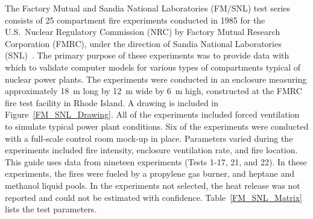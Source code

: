 The Factory Mutual and Sandia National Laboratories (FM/SNL) test series consists of 25 compartment fire experiments conducted in 1985 for the U.S.~Nuclear Regulatory Commission (NRC) by Factory Mutual Research Corporation (FMRC), under the direction of Sandia National Laboratories (SNL)~\cite{Nowlen:NUREG4681,Nowlen:NUREG4527}. The primary purpose of these experiments was to provide data with which to validate computer models for various types of compartments typical of nuclear power plants. The experiments were conducted in an enclosure measuring approximately 18~m long by 12~m wide by 6~m high, constructed at the FMRC fire test facility in Rhode Island. A drawing is included in Figure~\ref{FM_SNL_Drawing}. All of the experiments included forced ventilation to simulate typical power plant conditions. Six of the experiments were conducted with a full-scale control room mock-up in place. Parameters varied during the experiments included fire intensity, enclosure ventilation rate, and fire location. This guide uses data from nineteen experiments (Tests 1-17, 21, and 22). In these experiments, the fires were fueled by a propylene gas burner, and heptane and methanol liquid pools. In the experiments not selected, the heat release was not reported and could not be estimated with confidence. Table~\ref{FM_SNL_Matrix} lists the test parameters.


